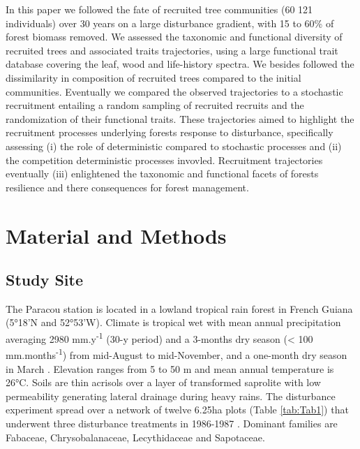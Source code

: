 \documentclass[fleqn,10pt]{ArtEcoFoG} %
\begin{document}
In this paper we followed the fate of recruited tree communities (60 121
individuals) over 30 years on a large disturbance gradient, with 15 to
60\% of forest biomass removed. We assessed the taxonomic and functional
diversity of recruited trees and associated traits trajectories, using a
large functional trait database covering the leaf, wood and life-history
spectra. We besides followed the dissimilarity in composition of
recruited trees compared to the initial communities. Eventually we
compared the observed trajectories to a stochastic recruitment entailing
a random sampling of recruited recruits and the randomization of their
functional traits. These trajectories aimed to highlight the recruitment
processes underlying forests response to disturbance, specifically
assessing (i) the role of deterministic compared to stochastic processes
and (ii) the competition deterministic processes invovled. Recruitment
trajectories eventually (iii) enlightened the taxonomic and functional
facets of forests resilience and there consequences for forest
management.

\section{Material and Methods}\label{material-and-methods}

\subsection{Study Site}\label{study-site}

The Paracou station is located in a lowland tropical rain forest in
French Guiana (5°18'N and 52°53'W). Climate is tropical wet with mean
annual precipitation averaging 2980 mm.y\textsuperscript{-1} (30-y
period) and a 3-months dry season (\textless{} 100
mm.months\textsuperscript{-1}) from mid-August to mid-November, and a
one-month dry season in March \citep{Wagner2011}. Elevation ranges from
5 to 50 m and mean annual temperature is 26°C. Soils are thin acrisols
over a layer of transformed saprolite with low permeability generating
lateral drainage during heavy rains. The disturbance experiment spread
over a network of twelve 6.25ha plots (Table \ref{tab:Tab1}) that
underwent three disturbance treatments in 1986-1987 \citep{Herault2018}.
Dominant families are Fabaceae, Chrysobalanaceae, Lecythidaceae and
Sapotaceae.
\end{document}
